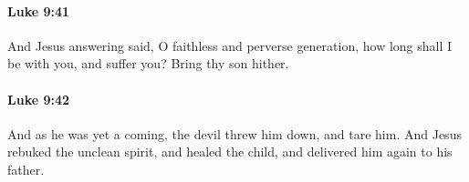 		\paragraph{Luke 9:41} %
			\label{LUKE-9-41}

			And Jesus answering said, O faithless and perverse generation, how long shall I be with you, and suffer you? Bring thy son hither.

			\begin{framed}
			\scriptsize
				\begin{compactdesc}
					\item[SBLG] 
				\end{compactdesc}
			\end{framed}

		\paragraph{Luke 9:42} %
			\label{LUKE-9-42}

			And as he was yet a coming, the devil threw him down, and tare him. And Jesus rebuked the unclean spirit, and healed the child, and delivered him again to his father.

